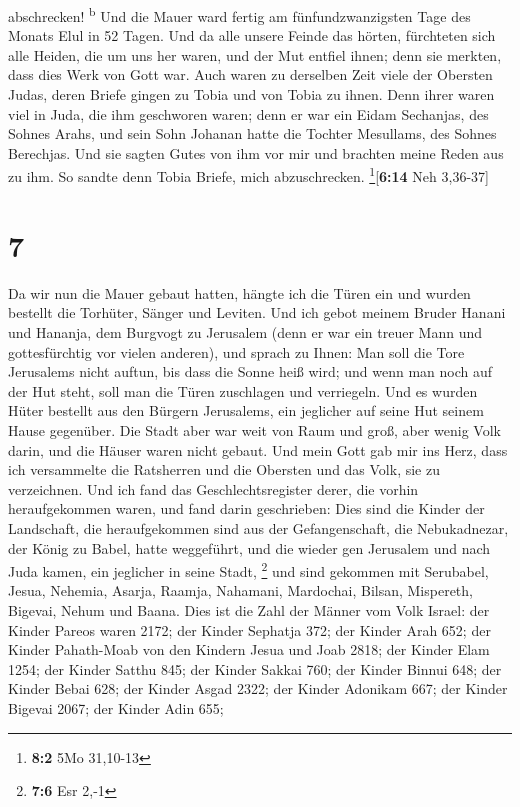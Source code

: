 abschrecken! \textsuperscript{b}  Und die Mauer ward
fertig am fünfundzwanzigsten Tage des Monats Elul in 52 Tagen.
 Und da alle unsere Feinde das hörten, fürchteten sich
alle Heiden, die um uns her waren, und der Mut entfiel ihnen; denn sie
merkten, dass dies Werk von Gott war.  Auch waren zu
derselben Zeit viele der Obersten Judas, deren Briefe gingen zu Tobia
und von Tobia zu ihnen.  Denn ihrer waren viel in Juda,
die ihm geschworen waren; denn er war ein Eidam Sechanjas, des Sohnes
Arahs, und sein Sohn Johanan hatte die Tochter Mesullams, des Sohnes
Berechjas.  Und sie sagten Gutes von ihm vor mir und
brachten meine Reden aus zu ihm. So sandte denn Tobia Briefe, mich
abzuschrecken. \footnote{\textbf{8:2} 5Mo 31,10-13}{[}\textbf{6:14} Neh
3,36-37{]}

\hypertarget{section-6}{%
\section{7}\label{section-6}}

 Da wir nun die Mauer gebaut hatten, hängte ich die Türen
ein und wurden bestellt die Torhüter, Sänger und Leviten. 
Und ich gebot meinem Bruder Hanani und Hananja, dem Burgvogt zu
Jerusalem (denn er war ein treuer Mann und gottesfürchtig vor vielen
anderen),  und sprach zu Ihnen: Man soll die Tore
Jerusalems nicht auftun, bis dass die Sonne heiß wird; und wenn man noch
auf der Hut steht, soll man die Türen zuschlagen und verriegeln. Und es
wurden Hüter bestellt aus den Bürgern Jerusalems, ein jeglicher auf
seine Hut seinem Hause gegenüber.  Die Stadt aber war weit
von Raum und groß, aber wenig Volk darin, und die Häuser waren nicht
gebaut.  Und mein Gott gab mir ins Herz, dass ich
versammelte die Ratsherren und die Obersten und das Volk, sie zu
verzeichnen. Und ich fand das Geschlechtsregister derer, die vorhin
heraufgekommen waren, und fand darin geschrieben:  Dies
sind die Kinder der Landschaft, die heraufgekommen sind aus der
Gefangenschaft, die Nebukadnezar, der König zu Babel, hatte weggeführt,
und die wieder gen Jerusalem und nach Juda kamen, ein jeglicher in seine
Stadt, \footnote{\textbf{7:6} Esr 2,-1}  und sind gekommen
mit Serubabel, Jesua, Nehemia, Asarja, Raamja, Nahamani, Mardochai,
Bilsan, Mispereth, Bigevai, Nehum und Baana. Dies ist die Zahl der
Männer vom Volk Israel:  der Kinder Pareos waren 2172;
 der Kinder Sephatja 372;  der Kinder Arah
652;  der Kinder Pahath-Moab von den Kindern Jesua und
Joab 2818;  der Kinder Elam 1254;  der
Kinder Satthu 845;  der Kinder Sakkai 760;
 der Kinder Binnui 648;  der Kinder Bebai
628;  der Kinder Asgad 2322;  der Kinder
Adonikam 667;  der Kinder Bigevai 2067; 
der Kinder Adin 655;

